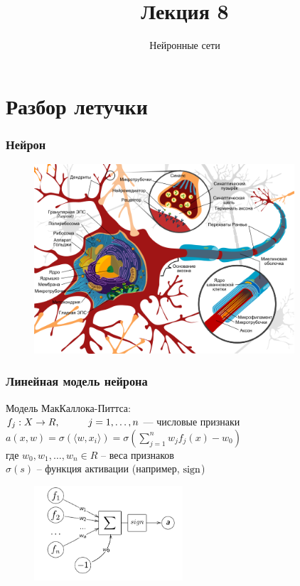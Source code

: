 \documentclass[10pt]{beamer}
\title{Лекция 8}
\subtitle{Нейронные сети}
\begin{document}
	

\section{Разбор летучки}

\frame{\titlepage}

\begin{frame}\frametitle{Нейрон}
	\begin{figure}[htbp]
	  \includegraphics[height=200pt, keepaspectratio = true]{images/neuron}   
	\end{figure}
\end{frame}

\begin{frame}\frametitle{Линейная модель нейрона}
	Модель МакКаллока-Питтса:\\
	$f_j: X \rightarrow R, \hspace{10mm} j = 1,\dots, n$ — числовые признаки\\
	$a(x,w) = \sigma(\langle w, x_i \rangle) = \sigma(\sum\limits_{j=1}^n w_j f_j(x) - w_0)$\\
	где $w_0, w_1, \dots,w_n \in R$ -- веса признаков\\
	$\sigma(s)$ -- функция активации (например, $\operatorname{sign}$)
	
	\begin{figure}[htbp]
	  \includegraphics[height=100pt, keepaspectratio = true]{images/neuron-scheme}   
	\end{figure}
\end{frame}
\end{document}
